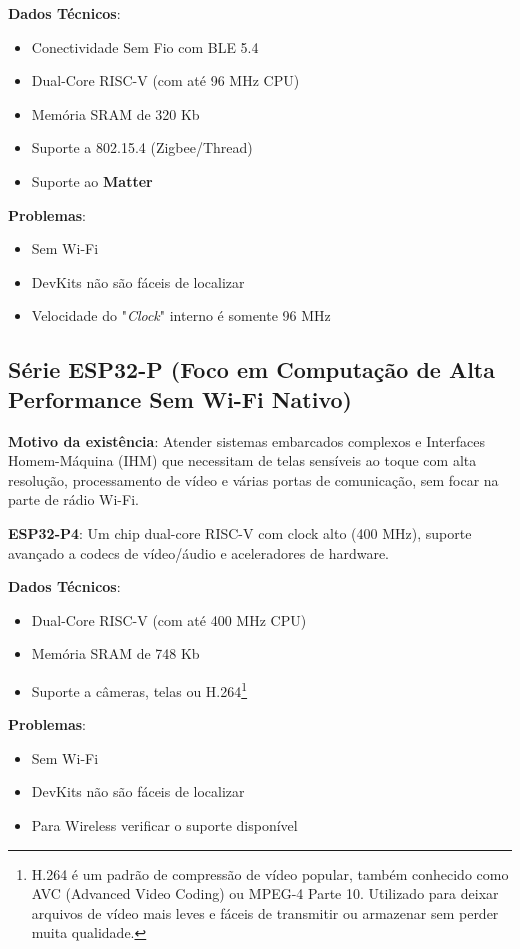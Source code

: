 \documentclass[a4paper,11pt]{article}
\begin{document}
\textbf{Dados Técnicos}: \vspace{-1em}
\begin{itemize}[nolistsep]
	\item Conectividade Sem Fio	com BLE 5.4
	\item Dual-Core RISC-V (com até 96 MHz CPU)
	\item Memória SRAM de 320 Kb
	\item Suporte a 802.15.4 (Zigbee/Thread)
	\item Suporte ao \textbf{Matter}
\end{itemize}

\textbf{Problemas}: \vspace{-1em}
\begin{itemize}[nolistsep]
	\item Sem Wi-Fi
	\item DevKits não são fáceis de localizar
	\item Velocidade do "\textit{Clock}" interno é somente 96 MHz
\end{itemize}

\subsection{Série ESP32-P (Foco em Computação de Alta Performance Sem Wi-Fi Nativo)}
\textbf{Motivo da existência}: Atender sistemas embarcados complexos e Interfaces Homem-Máquina (IHM) que necessitam de telas sensíveis ao toque com alta resolução, processamento de vídeo e várias portas de comunicação, sem focar na parte de rádio Wi-Fi.

\textbf{ESP32-P4}: Um chip dual-core RISC-V com clock alto (400 MHz), suporte avançado a codecs de vídeo/áudio e aceleradores de hardware.  

\textbf{Dados Técnicos}: \vspace{-1em}
\begin{itemize}[nolistsep]
	\item Dual-Core RISC-V (com até 400 MHz CPU)
	\item Memória SRAM de 748 Kb
	\item Suporte a câmeras, telas ou H.264\footnote{H.264 é um padrão de compressão de vídeo popular, também conhecido como AVC (Advanced Video Coding) ou MPEG-4 Parte 10. Utilizado para deixar arquivos de vídeo mais leves e fáceis de transmitir ou armazenar sem perder muita qualidade.}
\end{itemize}

\textbf{Problemas}: \vspace{-1em}
\begin{itemize}[nolistsep]
	\item Sem Wi-Fi
	\item DevKits não são fáceis de localizar
	\item Para Wireless verificar o suporte disponível
\end{itemize}
\end{document}
